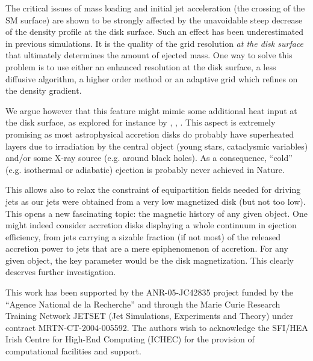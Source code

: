 \documentclass{aa}
\begin{document}
The critical issues of mass loading and initial jet acceleration (the crossing of the SM surface) are shown to be strongly affected by the unavoidable steep decrease of the density profile at the disk
surface. Such an effect has been underestimated in previous simulations. It is the quality of the grid resolution {\em at the disk surface} that ultimately determines the amount of ejected mass. One
way to solve this problem is to use either an enhanced resolution at the disk surface, a less diffusive algorithm, a higher order method or an adaptive grid which refines on the density gradient.

We argue however that this feature might mimic some additional heat input at the disk surface, as explored for instance by \citet{Ogilvie:1998lh}, \citet{2001ApJ...553..158O},
\citet{2000A&A...361.1178C}.  This aspect is extremely promising as most astrophysical accretion disks do probably have superheated layers due to irradiation by the central object (young stars,
cataclysmic variables) and/or some X-ray source (e.g. around black holes). As a consequence, ``cold'' (e.g. isothermal or adiabatic) ejection is probably never achieved in Nature.

This allows also to relax the constraint of equipartition fields needed for driving jets as our jets were obtained from a very low magnetized disk (but not too low). This opens a new fascinating
topic: the magnetic history of any given object. One might indeed consider accretion disks displaying a whole continuum in ejection efficiency, from jets carrying a sizable fraction (if not most) of
the released accretion power to jets that are a mere epiphenomenon of accretion. For any given object, the key parameter would be the disk magnetization. This clearly deserves further investigation.




\begin{acknowledgements}
This work has been supported by the ANR-05-JC42835 project funded by the ``Agence National de la Recherche'' and through the Marie Curie Research Training Network JETSET (Jet Simulations, Experiments
and Theory) under contract MRTN-CT-2004-005592. The authors wish to acknowledge the SFI/HEA Irish Centre for High-End Computing (ICHEC) for the provision of computational facilities and support.
\end{acknowledgements}


\end{document}
